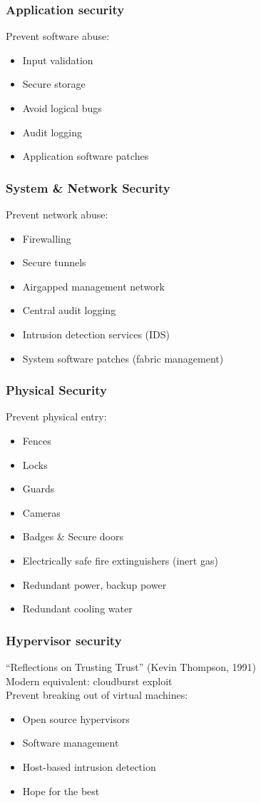 \documentclass{beamer}
\begin{document}
\begin{frame}
    \frametitle{Application security}
    Prevent software abuse:
    \begin{itemize}
      \item Input validation
      \item Secure storage
      \item Avoid logical bugs
      \item Audit logging
      \item Application software patches
    \end{itemize}
\end{frame}

\begin{frame}
    \frametitle{System \& Network Security}
    Prevent network abuse:
    \begin{itemize}
      \item Firewalling
      \item Secure tunnels %
      \item Airgapped management network
      \item Central audit logging
      \item Intrusion detection services (IDS)
      \item System software patches (fabric management)
    \end{itemize}
\end{frame}

\begin{frame}
    \frametitle{Physical Security}
    Prevent physical entry:
    \begin{itemize}
      \item Fences
      \item Locks
      \item Guards
      \item Cameras
      \item Badges \& Secure doors
      \item Electrically safe fire extinguishers (inert gas)
      \item Redundant power, backup power
      \item Redundant cooling water
    \end{itemize}
\end{frame}

\begin{frame}
    \frametitle{Hypervisor security}
    ``Reflections on Trusting Trust'' (Kevin Thompson, 1991) \\
    Modern equivalent: cloudburst exploit \\
    Prevent breaking out of virtual machines:
    \begin{itemize}
      \item Open source hypervisors
      \item Software management
      \item Host-based intrusion detection
      \item Hope for the best
    \end{itemize}
\end{frame}
\end{document}
